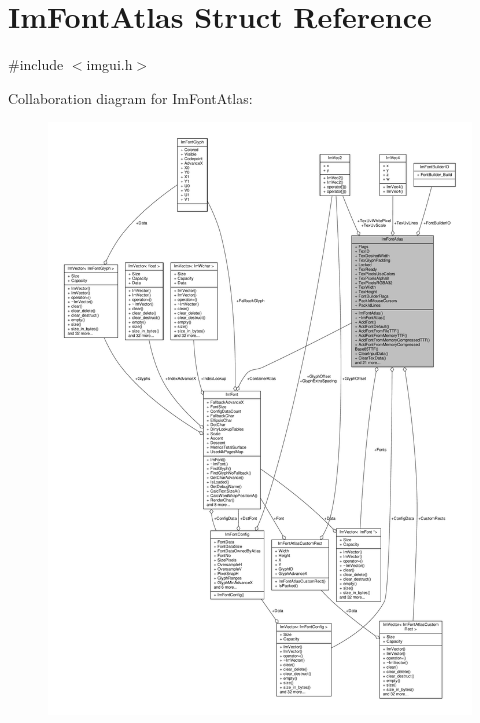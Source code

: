 \hypertarget{structImFontAtlas}{}\section{Im\+Font\+Atlas Struct Reference}
\label{structImFontAtlas}


{\ttfamily \#include $<$imgui.\+h$>$}



Collaboration diagram for Im\+Font\+Atlas\+:
\nopagebreak
\begin{figure}[H]
\begin{center}
\leavevmode
\includegraphics[width=350pt]{structImFontAtlas__coll__graph}
\end{center}
\end{figure}
